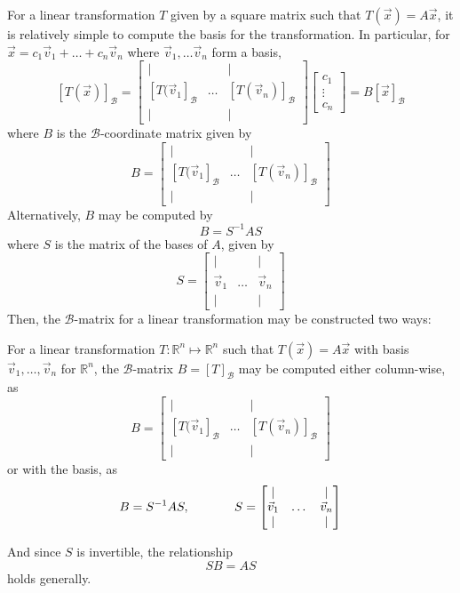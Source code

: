 For a linear transformation $T$ given by a square matrix such that $T(\vec{x}) = A\vec{x}$, it is relatively simple to compute the basis for the transformation. In particular, for $\vec{x} = c_1\vec{v}_1 + \dots + c_n\vec{v}_n$ where $\vec{v}_1,\dots\vec{v}_n$ form a basis, \[[T(\vec{x})]_\mathcal{B} = \begin{bmatrix}
    | & & |\\
    [T(\vec{v}_1]_\mathcal{B} & \dots & [T(\vec{v}_n)]_\mathcal{B}\\
    | & & |
\end{bmatrix}\begin{bmatrix}
    c_1\\
    \vdots\\
    c_n
\end{bmatrix} = B[\vec{x}]_\mathcal{B}\] where $B$ is the $\mathcal{B}$-coordinate matrix given by \[B = \begin{bmatrix}
    | & & |\\
    [T(\vec{v}_1]_\mathcal{B} & \dots & [T(\vec{v}_n)]_\mathcal{B}\\
    | & & |
\end{bmatrix}\]
Alternatively, $B$ may be computed by \[B = S^{-1} A S\] where $S$ is the matrix of the bases of $A$, given by \[S = \begin{bmatrix}
    | & & |\\
    \vec{v}_1 & \dots & \vec{v}_n\\
    | & & |
\end{bmatrix}\]
Then, the $\mathcal{B}$-matrix for a linear transformation may be constructed two ways:

\begin{shaded}
For a linear transformation $T:\mathbb{R}^n\mapsto\mathbb{R}^n$ such that $T(\vec{x}) = A\vec{x}$ with basis $\vec{v}_1,\dots,\vec{v}_n$ for $\mathbb{R}^n$, the $\mathcal{B}$-matrix $B = [T]_\mathcal{B}$ may be computed either column-wise, as \[B = \begin{bmatrix}
    | & & |\\
    [T(\vec{v}_1]_\mathcal{B} & \dots & [T(\vec{v}_n)]_\mathcal{B}\\
    | & & |
\end{bmatrix}\] or with the basis, as \[B = S^{-1}AS,\hspace{0.5in} S = \begin{bmatrix}
    | & & |\\
    \vec{v}_1 & \dots & \vec{v}_n\\
    | & & |
\end{bmatrix}\]

And since $S$ is invertible, the relationship \[SB = AS\] holds generally.
\end{shaded}

